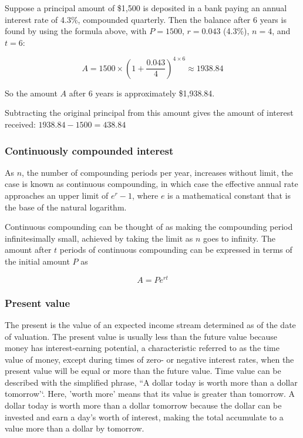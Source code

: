 \documentclass[
  12pt,
  oneside]{book}
\theoremstyle{definition}
\theoremstyle{definition}
\theoremstyle{definition}
\theoremstyle{definition}
\theoremstyle{remark}
\begin{document}
Suppose a principal amount of \$1,500 is deposited in a bank paying an annual interest rate of 4.3\%, compounded quarterly. Then the balance after 6 years is found by using the formula above, with \(P = 1500\), \(r = 0.043\) (4.3\%), \(n = 4\), and \(t = 6\):

\[
A=1500\times\left(1+\frac{0.043}{4}\right)^{4\times 6}\approx 1938.84
\]

So the amount \(A\) after 6 years is approximately \$1,938.84.

Subtracting the original principal from this amount gives the amount of interest received: \(1938.84-1500=438.84\)

\hypertarget{continuously-compounded-interest}{%
\subsubsection{Continuously compounded interest}\label{continuously-compounded-interest}}

As \(n\), the number of compounding periods per year, increases without limit, the case is known as continuous compounding, in which case the effective annual rate approaches an upper limit of \(e^r- 1\), where \(e\) is a mathematical constant that is the base of the natural logarithm.

Continuous compounding can be thought of as making the compounding period infinitesimally small, achieved by taking the limit as \(n\) goes to infinity. The amount after \(t\) periods of continuous compounding can be expressed in terms of the initial amount \(P\) as

\[
A=Pe^{rt}
\]

\hypertarget{present-value}{%
\subsubsection{Present value}\label{present-value}}

The present is the value of an expected income stream determined as of the date of valuation. The present value is usually less than the future value because money has interest-earning potential, a characteristic referred to as the time value of money, except during times of zero- or negative interest rates, when the present value will be equal or more than the future value. Time value can be described with the simplified phrase, ``A dollar today is worth more than a dollar tomorrow'`. Here, 'worth more' means that its value is greater than tomorrow. A dollar today is worth more than a dollar tomorrow because the dollar can be invested and earn a day's worth of interest, making the total accumulate to a value more than a dollar by tomorrow.
\end{document}
